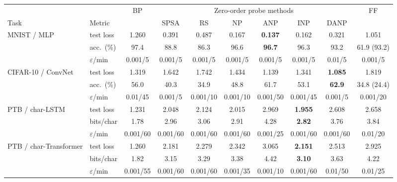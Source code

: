 \begin{tabular}{ll c cccccc c}
\toprule
 & & BP & \multicolumn{6}{c}{Zero-order probe methods} & FF \\
\cmidrule(lr){4-9}
Task & Metric & & SPSA & RS & NP & ANP & INP & DANP & \\
\midrule
MNIST / MLP & test loss & 1.260 & 0.391 & 0.487 & 0.167 & \textbf{0.137} & 0.162 & 0.321 & 1.051 \\
 & acc.\ (\%) & 97.4 & 88.8 & 86.3 & 96.6 & \textbf{96.7} & 96.3 & 93.2 & 61.9 (93.2) \\
 & $\varepsilon$/min & 0.001/5 & 0.001/5 & 0.001/5 & 0.001/5 & 0.001/5 & 0.001/5 & 0.01/5 & 0.001/5 \\
\addlinespace[2pt]
CIFAR-10 / ConvNet & test loss & 1.319 & 1.642 & 1.742 & 1.434 & 1.139 & 1.341 & \textbf{1.085} & 1.819 \\
 & acc.\ (\%) & 56.0 & 40.3 & 34.9 & 48.8 & 61.7 & 53.1 & \textbf{62.9} & 34.8 (24.4) \\
 & $\varepsilon$/min & 0.01/45 & 0.001/5 & 0.001/10 & 0.001/10 & 0.001/50 & 0.001/45 & 0.001/5 & 0.001/20 \\
\addlinespace[2pt]
PTB / char-LSTM & test loss & 1.231 & 2.048 & 2.124 & 2.015 & 2.969 & \textbf{1.955} & 2.608 & 2.658 \\
 & bits/char & 1.78 & 2.96 & 3.06 & 2.91 & 4.28 & \textbf{2.82} & 3.76 & 3.84 \\
 & $\varepsilon$/min & 0.001/60 & 0.001/60 & 0.001/60 & 0.001/60 & 0.001/25 & 0.001/60 & 0.001/60 & 0.01/20 \\
\addlinespace[2pt]
PTB / char-Transformer & test loss & 1.260 & 2.181 & 2.279 & 2.342 & 3.065 & \textbf{2.151} & 2.513 & 2.925 \\
 & bits/char & 1.82 & 3.15 & 3.29 & 3.38 & 4.42 & \textbf{3.10} & 3.63 & 4.22 \\
 & $\varepsilon$/min & 0.001/55 & 0.001/60 & 0.001/60 & 0.001/35 & 0.001/10 & 0.001/60 & 0.01/50 & 0.01/25 \\
\bottomrule
\end{tabular}
